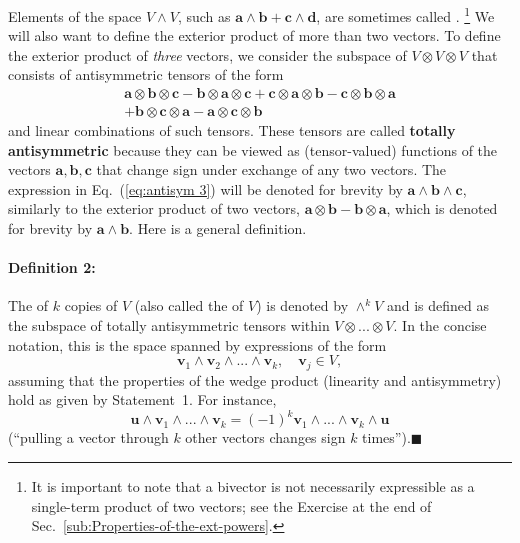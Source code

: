 Elements of the space $V\wedge V$, such as $\mathbf{a}\wedge\mathbf{b}+\mathbf{c}\wedge\mathbf{d}$,
are sometimes called .%
\footnote{It is important to note that a bivector is not necessarily expressible
as a single-term product of two vectors; see the Exercise at the end
of Sec.~\ref{sub:Properties-of-the-ext-powers}.%
} We will also want to define the exterior product of more than two
vectors. To define the exterior product of \emph{three} vectors, we
consider the subspace of $V\otimes V\otimes V$ that consists of antisymmetric
tensors of the form\begin{align}
\mathbf{a}\otimes\mathbf{b}\otimes\mathbf{c}-\mathbf{b}\otimes\mathbf{a}\otimes\mathbf{c}+\mathbf{c}\otimes\mathbf{a}\otimes\mathbf{b}-\mathbf{c}\otimes\mathbf{b}\otimes\mathbf{a}\nonumber \\
+\mathbf{b}\otimes\mathbf{c}\otimes\mathbf{a}-\mathbf{a}\otimes\mathbf{c}\otimes\mathbf{b}\label{eq:antisym 3}\end{align}
and linear combinations of such tensors. These tensors are called
\textbf{totally antisymmetric} because
they can be viewed as (tensor-valued) functions of the vectors $\mathbf{a},\mathbf{b},\mathbf{c}$
that change sign under exchange of any two vectors. The expression
in Eq.~(\ref{eq:antisym 3}) will be denoted for brevity by $\mathbf{a}\wedge\mathbf{b}\wedge\mathbf{c}$,
similarly to the exterior product of two vectors, $\mathbf{a}\otimes\mathbf{b}-\mathbf{b}\otimes\mathbf{a}$,
which is denoted for brevity by $\mathbf{a}\wedge\mathbf{b}$. Here
is a general definition.


\paragraph{Definition 2:}

The  of $k$ copies
of $V$ (also called the  of $V$)
is denoted by $\wedge^{k}V$ and is defined as the subspace of totally
antisymmetric tensors within $V\otimes...\otimes V$. In the concise
notation, this is the space spanned by expressions of the form\[
\mathbf{v}_{1}\wedge\mathbf{v}_{2}\wedge...\wedge\mathbf{v}_{k},\quad\mathbf{v}_{j}\in V,\]
assuming that the properties of the wedge product (linearity and antisymmetry)
hold as given by Statement~1. For instance, \begin{equation}
\mathbf{u}\wedge\mathbf{v}_{1}\wedge...\wedge\mathbf{v}_{k}=\left(-1\right)^{k}\mathbf{v}_{1}\wedge...\wedge\mathbf{v}_{k}\wedge\mathbf{u}\label{eq:uv pull}\end{equation}
({}``pulling a vector through $k$ other vectors changes sign $k$
times'').\hfill{}$\blacksquare$


